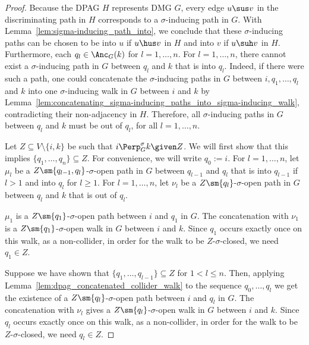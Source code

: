 \begin{proof}
  Because the DPAG $H$ represents DMG $G$, every edge $u \sus v$ in the discriminating path in $H$ corresponds to a $\sigma$-inducing path in $G$. %
  With Lemma~\ref{lem:sigma-inducing_path_into}, we conclude that these $\sigma$-inducing paths can be chosen to be into $u$ if $u \hus v$ in $H$ and into $v$ if $u \suh v$ in $H$. 
  Furthermore, each $q_l \in \Anc_G(k)$ for $l = 1,\dots,n$. 
  For $l=1,\dots,n$, there cannot exist a $\sigma$-inducing path in $G$ between $q_l$ and $k$ that is into $q_l$.
  Indeed, if there were such a path, one could concatenate the $\sigma$-inducing paths in $G$ between $i, q_1, \dots, q_l$ and $k$ into one $\sigma$-inducing walk in $G$ between $i$ and $k$ by Lemma~\ref{lem:concatenating_sigma-inducing_paths_into_sigma-inducing_walk}, contradicting their non-adjacency in $H$.
  Therefore, all $\sigma$-inducing paths in $G$ between $q_l$ and $k$ must be out of $q_l$, for all $l=1,\dots,n$.

  Let $Z \subseteq V \setminus \{i,k\}$ be such that $i \Perp^\sigma_G k \given Z$.
  We will first show that this implies $\{q_1,\dots,q_n\} \subseteq Z$.
  For convenience, we will write $q_0 := i$.
  For $l=1,\dots,n$, let $\mu_l$ be a $Z\sm\{q_{l-1},q_{l}\}$-$\sigma$-open path in $G$ between $q_{l-1}$ and $q_l$ that is into $q_{l-1}$ if $l > 1$ and into $q_l$ for $l \ge 1$.
  For $l=1,\dots,n$, let $\nu_l$ be a $Z\sm\{q_l\}$-$\sigma$-open path in $G$ between $q_l$ and $k$ that is out of $q_l$.

  $\mu_1$ is a $Z\sm\{q_1\}$-$\sigma$-open path between $i$ and $q_1$ in $G$.
  The concatenation with $\nu_1$ is a $Z\sm\{q_1\}$-$\sigma$-open walk in $G$ between $i$ and $k$.
  Since $q_1$ occurs exactly once on this walk, as a non-collider, in order for the walk to be $Z$-$\sigma$-closed, we need $q_1 \in Z$.
  
  Suppose we have shown that $\{q_1,\dots,q_{l-1}\} \subseteq Z$ for $1 < l \le n$. Then,
  applying Lemma~\ref{lem:dpag_concatenated_collider_walk} to the sequence $q_0,\dots,q_l$ we get the existence of a $Z\sm\{q_l\}$-$\sigma$-open path between $i$ and $q_l$ in $G$.
  The concatenation with $\nu_l$ gives a $Z\sm\{q_l\}$-$\sigma$-open walk in $G$ between $i$ and $k$.
  Since $q_l$ occurs exactly once on this walk, as a non-collider, in order for the walk to be $Z$-$\sigma$-closed, we need $q_l \in Z$.


\end{proof}
